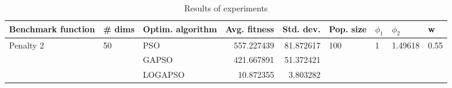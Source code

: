 \begin{table}
\centering
\caption{Results of experiments}
\begin{tabular}{lllrrllll}
\toprule
        Benchmark function &             \# dims & Optim. algorithm &  Avg. fitness &  Std. dev. &            Pop. size &         $\phi_{1}$ &               $\phi_{2}$ &                     w \\
\midrule
\multirow{3}{*}{Penalty 2} & \multirow{3}{*}{50} &              PSO &    557.227439 &  81.872617 & \multirow{3}{*}{100} & \multirow{3}{*}{1} & \multirow{3}{*}{1.49618} & \multirow{3}{*}{0.55} \\
                           &                     &            GAPSO &    421.667891 &  51.372421 &                      &                    &                          &                       \\
                           &                     &          LOGAPSO &     10.872355 &   3.803282 &                      &                    &                          &                       \\
\bottomrule
\end{tabular}
\end{table}
